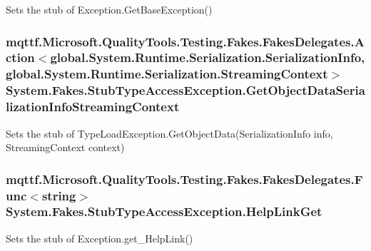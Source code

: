 Sets the stub of Exception.\-Get\-Base\-Exception()

\hypertarget{class_system_1_1_fakes_1_1_stub_type_access_exception_aa4c69c2dfe28100c454a65034f91459a}{
\subsubsection[{Get\-Object\-Data\-Serialization\-Info\-Streaming\-Context}]{\setlength{\rightskip}{0pt plus 5cm}mqttf.\-Microsoft.\-Quality\-Tools.\-Testing.\-Fakes.\-Fakes\-Delegates.\-Action$<$global.\-System.\-Runtime.\-Serialization.\-Serialization\-Info, global.\-System.\-Runtime.\-Serialization.\-Streaming\-Context$>$ System.\-Fakes.\-Stub\-Type\-Access\-Exception.\-Get\-Object\-Data\-Serialization\-Info\-Streaming\-Context}}\label{class_system_1_1_fakes_1_1_stub_type_access_exception_aa4c69c2dfe28100c454a65034f91459a}


Sets the stub of Type\-Load\-Exception.\-Get\-Object\-Data(\-Serialization\-Info info, Streaming\-Context context)

\hypertarget{class_system_1_1_fakes_1_1_stub_type_access_exception_a14ee7d54d13635962a5e133495c03a73}{
\subsubsection[{Help\-Link\-Get}]{\setlength{\rightskip}{0pt plus 5cm}mqttf.\-Microsoft.\-Quality\-Tools.\-Testing.\-Fakes.\-Fakes\-Delegates.\-Func$<$string$>$ System.\-Fakes.\-Stub\-Type\-Access\-Exception.\-Help\-Link\-Get}}\label{class_system_1_1_fakes_1_1_stub_type_access_exception_a14ee7d54d13635962a5e133495c03a73}


Sets the stub of Exception.\-get\-\_\-\-Help\-Link()

